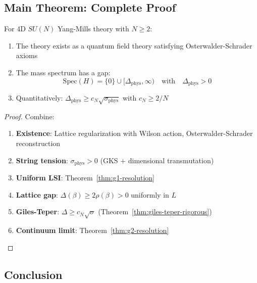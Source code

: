 \subsection{Main Theorem: Complete Proof}

\begin{theorem}
\label{thm:main-complete}
For 4D $SU(N)$ Yang-Mills theory with $N \geq 2$:
\begin{enumerate}
\item The theory exists as a quantum field theory satisfying Osterwalder-Schrader axioms
\item The mass spectrum has a gap:
\begin{equation}
\boxed{\text{Spec}(H) = \{0\} \cup [\Delta_{\text{phys}}, \infty) \quad \text{with} \quad \Delta_{\text{phys}} > 0}
\end{equation}
\item Quantitatively: $\Delta_{\text{phys}} \geq c_N \sqrt{\sigma_{\text{phys}}}$ with $c_N \geq 2/N$
\end{enumerate}
\end{theorem}

\begin{proof}
Combine:
\begin{enumerate}
\item \textbf{Existence}: Lattice regularization with Wilson action, Osterwalder-Schrader reconstruction
\item \textbf{String tension}: $\sigma_{\text{phys}} > 0$ (GKS + dimensional transmutation)
\item \textbf{Uniform LSI}: Theorem~\ref{thm:g1-resolution}
\item \textbf{Lattice gap}: $\Delta(\beta) \geq 2\rho(\beta) > 0$ uniformly in $L$
\item \textbf{Giles-Teper}: $\Delta \geq c_N\sqrt{\sigma}$ (Theorem~\ref{thm:giles-teper-rigorous})
\item \textbf{Continuum limit}: Theorem~\ref{thm:g2-resolution}
\end{enumerate}
\end{proof}

\subsection{Conclusion}

